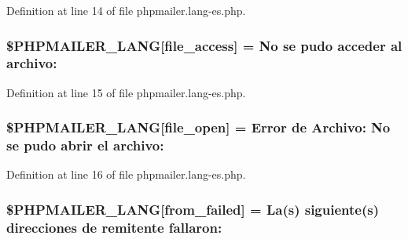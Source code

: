 Definition at line 14 of file phpmailer.\+lang-\/es.\+php.

\subsubsection[{\texorpdfstring{\$\+P\+H\+P\+M\+A\+I\+L\+E\+R\+\_\+\+L\+A\+NG}{$PHPMAILER_LANG}}]{\setlength{\rightskip}{0pt plus 5cm}\$P\+H\+P\+M\+A\+I\+L\+E\+R\+\_\+\+L\+A\+NG\mbox{[}\textquotesingle{}file\+\_\+access\textquotesingle{}\mbox{]} = \textquotesingle{}No se pudo acceder al archivo\+: \textquotesingle{}}\hypertarget{phpmailer_8lang-es_8php_a7e83349023b856ef9e5c46e30ae6d51e}{}\label{phpmailer_8lang-es_8php_a7e83349023b856ef9e5c46e30ae6d51e}


Definition at line 15 of file phpmailer.\+lang-\/es.\+php.

\subsubsection[{\texorpdfstring{\$\+P\+H\+P\+M\+A\+I\+L\+E\+R\+\_\+\+L\+A\+NG}{$PHPMAILER_LANG}}]{\setlength{\rightskip}{0pt plus 5cm}\$P\+H\+P\+M\+A\+I\+L\+E\+R\+\_\+\+L\+A\+NG\mbox{[}\textquotesingle{}file\+\_\+open\textquotesingle{}\mbox{]} = \textquotesingle{}Error de Archivo\+: No se pudo abrir el archivo\+: \textquotesingle{}}\hypertarget{phpmailer_8lang-es_8php_a28d1a6517bf4c942a0ddd506188ad2e0}{}\label{phpmailer_8lang-es_8php_a28d1a6517bf4c942a0ddd506188ad2e0}


Definition at line 16 of file phpmailer.\+lang-\/es.\+php.

\subsubsection[{\texorpdfstring{\$\+P\+H\+P\+M\+A\+I\+L\+E\+R\+\_\+\+L\+A\+NG}{$PHPMAILER_LANG}}]{\setlength{\rightskip}{0pt plus 5cm}\$P\+H\+P\+M\+A\+I\+L\+E\+R\+\_\+\+L\+A\+NG\mbox{[}\textquotesingle{}from\+\_\+failed\textquotesingle{}\mbox{]} = \textquotesingle{}La({\bf s}) siguiente({\bf s}) direcciones de remitente fallaron\+: \textquotesingle{}}\hypertarget{phpmailer_8lang-es_8php_adf832ae12155a09be077c6d5e4fd7e22}{}\label{phpmailer_8lang-es_8php_adf832ae12155a09be077c6d5e4fd7e22}


